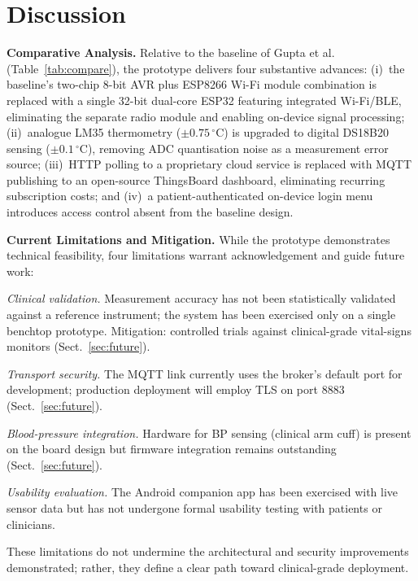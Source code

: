 \documentclass[pdflatex,sn-mathphys-num]{sn-jnl}
\begin{document}
\FloatBarrier
\section{Discussion}\label{sec:discussion}

\noindent\textbf{Comparative Analysis.} Relative to the baseline of
Gupta et al.~\cite{gupta2020} (Table~\ref{tab:compare}), the
prototype delivers four substantive advances: (i)~the baseline's
two-chip 8-bit AVR plus ESP8266 Wi-Fi module combination is replaced
with a single 32-bit dual-core ESP32 featuring integrated Wi-Fi/BLE,
eliminating the separate radio module and enabling on-device signal
processing; (ii)~analogue LM35 thermometry
($\pm0.75\,^\circ$C) is upgraded to digital DS18B20 sensing
($\pm0.1\,^\circ$C), removing ADC quantisation noise as a
measurement error source; (iii)~HTTP polling to a proprietary cloud
service is replaced with MQTT publishing to an
open-source ThingsBoard dashboard, eliminating recurring
subscription costs; and (iv)~a patient-authenticated on-device login
menu introduces access control absent from the baseline design.

\noindent\textbf{Current Limitations and Mitigation.} While the
prototype demonstrates technical feasibility, four limitations
warrant acknowledgement and guide future work:

\noindent\textit{Clinical validation.} Measurement accuracy has not
been statistically validated against a reference instrument; the
system has been exercised only on a single benchtop prototype.
Mitigation: controlled trials against clinical-grade vital-signs
monitors (Sect.~\ref{sec:future}).

\noindent\textit{Transport security.} The MQTT link currently uses
the broker's default port for development; production deployment
will employ TLS on port 8883 (Sect.~\ref{sec:future}).

\noindent\textit{Blood-pressure integration.} Hardware for BP
sensing (clinical arm cuff) is present on the board design but
firmware integration remains outstanding (Sect.~\ref{sec:future}).

\noindent\textit{Usability evaluation.} The Android companion app
has been exercised with live sensor data but has not undergone
formal usability testing with patients or clinicians.

These limitations do not undermine the architectural and security
improvements demonstrated; rather, they define a clear path toward
clinical-grade deployment.
\end{document}

